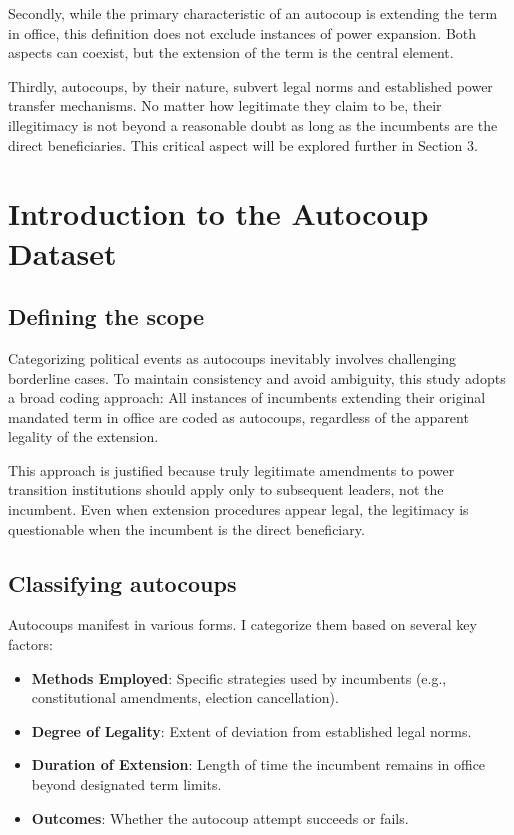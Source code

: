 \documentclass[
  12pt,
]{report}
\begin{document}
Secondly, while the primary characteristic of an autocoup is extending
the term in office, this definition does not exclude instances of power
expansion. Both aspects can coexist, but the extension of the term is
the central element.

Thirdly, autocoups, by their nature, subvert legal norms and established
power transfer mechanisms. No matter how legitimate they claim to be,
their illegitimacy is not beyond a reasonable doubt as long as the
incumbents are the direct beneficiaries. This critical aspect will be
explored further in Section 3.

\section{Introduction to the Autocoup
Dataset}\label{introduction-to-the-autocoup-dataset}

\subsection{Defining the scope}\label{defining-the-scope}

Categorizing political events as autocoups inevitably involves
challenging borderline cases. To maintain consistency and avoid
ambiguity, this study adopts a broad coding approach: All instances of
incumbents extending their original mandated term in office are coded as
autocoups, regardless of the apparent legality of the extension.

This approach is justified because truly legitimate amendments to power
transition institutions should apply only to subsequent leaders, not the
incumbent. Even when extension procedures appear legal, the legitimacy
is questionable when the incumbent is the direct beneficiary.

\subsection{Classifying autocoups}\label{sec-classify}

Autocoups manifest in various forms. I categorize them based on several
key factors:

\begin{itemize}
\item
  \textbf{Methods Employed}: Specific strategies used by incumbents
  (e.g., constitutional amendments, election cancellation).
\item
  \textbf{Degree of Legality}: Extent of deviation from established
  legal norms.
\item
  \textbf{Duration of Extension}: Length of time the incumbent remains
  in office beyond designated term limits.
\item
  \textbf{Outcomes}: Whether the autocoup attempt succeeds or fails.
\end{itemize}
\end{document}
